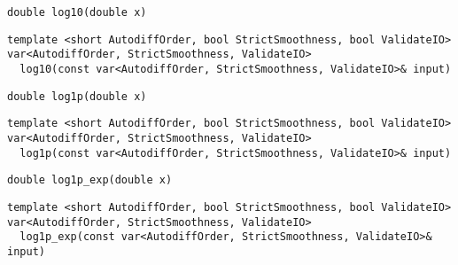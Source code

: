 \begin{tcolorbox}[colback=white,colframe=gray90, coltitle=black,boxrule=3pt,
fonttitle=\bfseries,title= Log10]

\begin{verbatim}
double log10(double x)

\end{verbatim}

\begin{verbatim}
template <short AutodiffOrder, bool StrictSmoothness, bool ValidateIO>
var<AutodiffOrder, StrictSmoothness, ValidateIO>
  log10(const var<AutodiffOrder, StrictSmoothness, ValidateIO>& input)

\end{verbatim}

\end{tcolorbox}

\begin{tcolorbox}[colback=white,colframe=gray90, coltitle=black,boxrule=3pt,
fonttitle=\bfseries,title= Log1p]

\begin{verbatim}
double log1p(double x)

\end{verbatim}

\begin{verbatim}
template <short AutodiffOrder, bool StrictSmoothness, bool ValidateIO>
var<AutodiffOrder, StrictSmoothness, ValidateIO>
  log1p(const var<AutodiffOrder, StrictSmoothness, ValidateIO>& input)

\end{verbatim}

\end{tcolorbox}

\begin{tcolorbox}[colback=white,colframe=gray90, coltitle=black,boxrule=3pt,
fonttitle=\bfseries,title= Log1p Exp]

\begin{verbatim}
double log1p_exp(double x)

\end{verbatim}

\begin{verbatim}
template <short AutodiffOrder, bool StrictSmoothness, bool ValidateIO>
var<AutodiffOrder, StrictSmoothness, ValidateIO>
  log1p_exp(const var<AutodiffOrder, StrictSmoothness, ValidateIO>& input)

\end{verbatim}

\end{tcolorbox}

